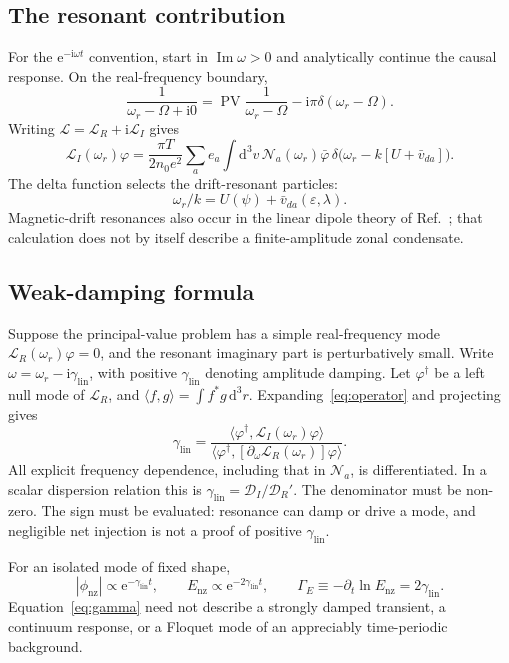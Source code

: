 \documentclass[10pt,a4paper]{article}
\newcommand{\dd}{\mathrm{d}}
\newcommand{\ii}{\mathrm{i}}
\newcommand{\E}{\mathrm{e}}
\newcommand{\N}{\mathcal{N}}
\newcommand{\Op}{\mathcal{L}}
\newcommand{\varphibar}{\bar\varphi}
\newcommand{\vd}{\bar v_{da}}
\newcommand{\nz}{\mathrm{nz}}
\newcommand{\lin}{\mathrm{lin}}
\DeclareMathOperator{\PV}{PV}
\begin{document}
\subsection{The resonant contribution}
For the $\E^{-\ii\omega t}$ convention, start in $\operatorname{Im}\omega>0$ and analytically continue the causal response. On the real-frequency boundary,
\begin{equation}
 \frac{1}{\omega_r-\Omega+\ii0}
 =\PV\frac{1}{\omega_r-\Omega}-\ii\pi\delta(\omega_r-\Omega).
 \label{eq:landau}
\end{equation}
Writing $\Op=\Op_R+\ii\Op_I$ gives
\begin{equation}
 \Op_I(\omega_r)\varphi
 =\frac{\pi T}{2n_0e^2}\sum_a e_a\int\dd^3v\,
 \N_a(\omega_r)\varphibar\,
 \delta\!\bigl(\omega_r-k[U+\vd]\bigr).
 \label{eq:imaginary}
\end{equation}
The delta function selects the drift-resonant particles:
\begin{equation}
 \omega_r/k=U(\psi)+\vd(\varepsilon,\lambda).
 \label{eq:resonance}
\end{equation}
Magnetic-drift resonances also occur in the linear dipole theory of Ref.~\cite{mishchenko}; that calculation does not by itself describe a finite-amplitude zonal condensate.

\subsection{Weak-damping formula}
Suppose the principal-value problem has a simple real-frequency mode $\Op_R(\omega_r)\varphi=0$, and the resonant imaginary part is perturbatively small. Write $\omega=\omega_r-\ii\gamma_\lin$, with positive $\gamma_\lin$ denoting amplitude damping. Let $\varphi^\dagger$ be a left null mode of $\Op_R$, and $\langle f,g\rangle=\int f^*g\,\dd^3r$. Expanding~\eqref{eq:operator} and projecting gives
\begin{equation}
 \boxed{\gamma_\lin=
 \frac{\langle\varphi^\dagger,\Op_I(\omega_r)\varphi\rangle}
 {\langle\varphi^\dagger,[\partial_\omega\Op_R(\omega_r)]\varphi\rangle}.}
 \label{eq:gamma}
\end{equation}
All explicit frequency dependence, including that in $\N_a$, is differentiated. In a scalar dispersion relation this is $\gamma_\lin=\mathcal D_I/\mathcal D_R'$. The denominator must be non-zero. The sign must be evaluated: resonance can damp or drive a mode, and negligible net injection is not a proof of positive $\gamma_\lin$.

For an isolated mode of fixed shape,
\begin{equation}
 |\phi_\nz|\propto\E^{-\gamma_\lin t},\qquad
 E_\nz\propto\E^{-2\gamma_\lin t},\qquad
 \Gamma_E\equiv-\partial_t\ln E_\nz=2\gamma_\lin.
 \label{eq:energy-rate}
\end{equation}
Equation~\eqref{eq:gamma} need not describe a strongly damped transient, a continuum response, or a Floquet mode of an appreciably time-periodic background.
\end{document}

